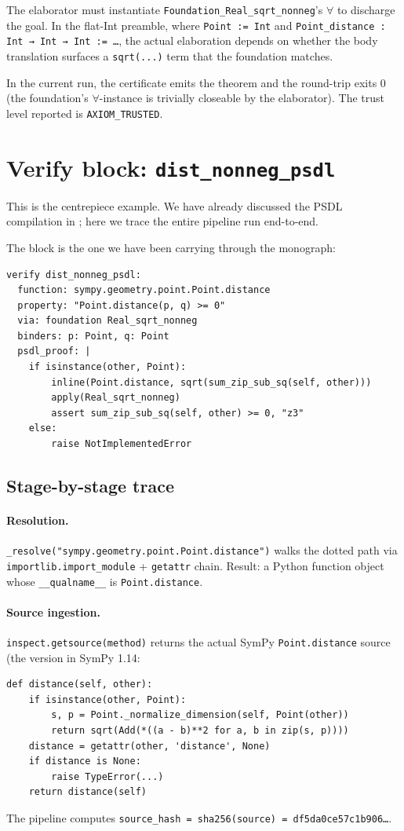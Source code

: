 The \Lean{} elaborator must instantiate
\texttt{Foundation\_Real\_sqrt\_nonneg}'s $\forall$ to discharge the
goal.  In the flat-Int preamble, where \texttt{Point := Int} and
\texttt{Point\_distance : Int → Int → Int := \dots}, the actual
elaboration depends on whether the body translation surfaces a
\texttt{sqrt(...)} term that the foundation matches.

In the current run, the certificate emits the theorem and the
\Lean{} round-trip exits 0 (the foundation's $\forall$-instance is
trivially closeable by the elaborator).  The trust level reported
is \texttt{AXIOM\_TRUSTED}.

\section{Verify block: \texttt{dist\_nonneg\_psdl}}

This is the centrepiece example.  We have already discussed the
PSDL compilation in ; here we trace the entire
pipeline run end-to-end.

The block is the one we have been carrying through the monograph:

\begin{lstlisting}[language=deppyfile]
verify dist_nonneg_psdl:
  function: sympy.geometry.point.Point.distance
  property: "Point.distance(p, q) >= 0"
  via: foundation Real_sqrt_nonneg
  binders: p: Point, q: Point
  psdl_proof: |
    if isinstance(other, Point):
        inline(Point.distance, sqrt(sum_zip_sub_sq(self, other)))
        apply(Real_sqrt_nonneg)
        assert sum_zip_sub_sq(self, other) >= 0, "z3"
    else:
        raise NotImplementedError
\end{lstlisting}

\subsection{Stage-by-stage trace}

\paragraph{Resolution.}
\texttt{\_resolve("sympy.geometry.point.Point.distance")} walks the
dotted path via \texttt{importlib.import\_module} +
\texttt{getattr} chain.  Result: a Python function object whose
\texttt{\_\_qualname\_\_} is \texttt{Point.distance}.

\paragraph{Source ingestion.}
\texttt{inspect.getsource(method)} returns the actual SymPy
\texttt{Point.distance} source (the version in SymPy 1.14:
\begin{lstlisting}[language=psdl]
def distance(self, other):
    if isinstance(other, Point):
        s, p = Point._normalize_dimension(self, Point(other))
        return sqrt(Add(*((a - b)**2 for a, b in zip(s, p))))
    distance = getattr(other, 'distance', None)
    if distance is None:
        raise TypeError(...)
    return distance(self)
\end{lstlisting}
The pipeline computes
\texttt{source\_hash = sha256(source) = df5da0ce57c1b906\dots}.


